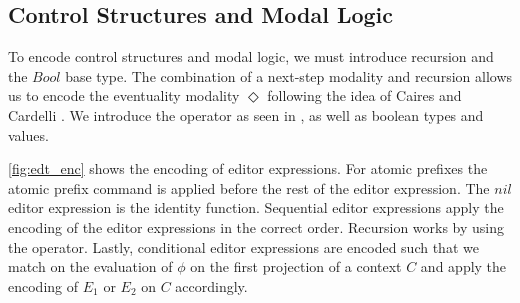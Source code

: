 \documentclass[sigplan,screen]{acmart}
\begin{document}
\subsection{Control Structures and Modal Logic}

To encode control structures and modal logic, we must introduce
recursion and the $Bool$ base type. The combination of a next-step
modality and recursion allows us to encode the eventuality modality
$\Diamond$ following the idea of Caires and Cardelli
\cite{CAIRES2003194}. We introduce the \fix operator as seen in
\cite{types_programming_languages}, as well as boolean types and
values.

\cref{fig:edt_enc} shows the encoding of editor expressions. For
atomic prefixes the atomic prefix command is applied before the
rest of the editor expression. The $nil$ editor expression is
the identity function. Sequential editor expressions apply the
encoding of the editor expressions in the correct order. Recursion
works by using the \fix operator. Lastly, conditional
editor expressions are encoded such that we match on the evaluation of
$\phi$ on the first projection of a context $C$ and apply the encoding
of $E_1$ or $E_2$ on $C$ accordingly.

\end{document}

